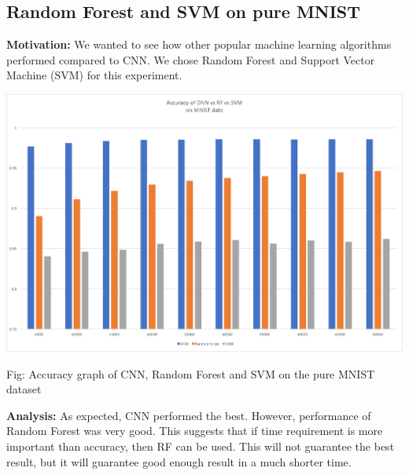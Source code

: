 \documentclass{article}
\begin{document}
\subsection*{Random Forest and SVM on pure MNIST}
\textbf{Motivation:} We wanted to see how other popular machine learning algorithms performed compared to CNN. We chose Random Forest and Support Vector Machine (SVM) for this experiment.
\begin{center}
	\includegraphics[scale=0.35]{DNN_RF_SVM}
\end{center}
\begin{center}
	Fig: Accuracy graph of CNN, Random Forest and SVM on the pure MNIST dataset
\end{center}

\textbf{Analysis:} As expected, CNN performed the best. However, performance of Random Forest was very good. This suggests that if time requirement is more important than accuracy, then RF can be used. This will not guarantee the best result, but it will guarantee good enough result in a much shorter time.
\end{document}
